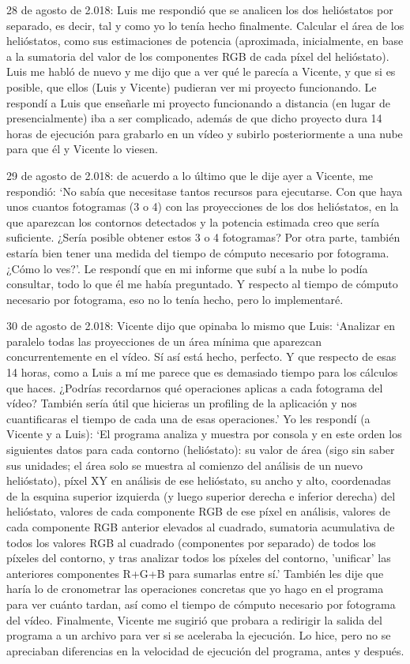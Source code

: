 \documentclass[12pt]{article}
\begin{document}
28 de agosto de 2.018: Luis me respondió que se analicen los dos helióstatos por separado, es decir, tal y como yo lo tenía hecho finalmente. Calcular el área de los helióstatos, como sus estimaciones de potencia (aproximada, inicialmente, en base a la sumatoria del valor de los componentes RGB de cada píxel del helióstato). Luis me habló de nuevo y me dijo que a ver qué le parecía a Vicente, y que si es posible, que ellos (Luis y Vicente) pudieran ver mi proyecto funcionando. Le respondí a Luis que enseñarle mi proyecto funcionando a distancia (en lugar de presencialmente) iba a ser complicado, además de que dicho proyecto dura 14 horas de ejecución para grabarlo en un vídeo y subirlo posteriormente a una nube para que él y Vicente lo viesen.

29 de agosto de 2.018: de acuerdo a lo último que le dije ayer a Vicente, me respondió: ‘No sabía que necesitase tantos recursos para ejecutarse. Con que haya unos cuantos fotogramas (3 o 4) con las proyecciones de los dos helióstatos, en la que aparezcan los contornos detectados y la potencia estimada creo que sería suficiente. ¿Sería posible obtener estos 3 o 4 fotogramas? Por otra parte, también estaría bien tener una medida del tiempo de cómputo necesario por fotograma. ¿Cómo lo ves?’. Le respondí que en mi informe que subí a la nube lo podía consultar, todo lo que él me había preguntado. Y respecto al tiempo de cómputo necesario por fotograma, eso no lo tenía hecho, pero lo implementaré.

30 de agosto de 2.018: Vicente dijo que opinaba lo mismo que Luis: ‘Analizar en paralelo todas las proyecciones de un área mínima que aparezcan concurrentemente en el vídeo. Sí así está hecho, perfecto. Y que respecto de esas 14 horas, como a Luis a mí me parece que es demasiado tiempo para los cálculos que haces. ¿Podrías recordarnos qué operaciones aplicas a cada fotograma del vídeo? También sería útil que hicieras un profiling de la aplicación y nos cuantificaras el tiempo de cada una de esas operaciones.’ Yo les respondí (a Vicente y a Luis): ‘El programa analiza y muestra por consola y en este orden los siguientes datos para cada contorno (helióstato): su valor de área (sigo sin saber sus unidades; el área solo se muestra al comienzo del análisis de un nuevo helióstato), píxel XY en análisis de ese helióstato, su ancho y alto, coordenadas de la esquina superior izquierda (y luego superior derecha e inferior derecha) del helióstato, valores de cada componente RGB de ese píxel en análisis, valores de cada componente RGB anterior elevados al cuadrado, sumatoria acumulativa de todos los valores RGB al cuadrado (componentes por separado) de todos los píxeles del contorno, y tras analizar todos los píxeles del contorno, 'unificar' las anteriores componentes R+G+B para sumarlas entre sí.’ También les dije que haría lo de cronometrar las operaciones concretas que yo hago en el programa para ver cuánto tardan, así como el tiempo de cómputo necesario por fotograma del vídeo. Finalmente, Vicente me sugirió que probara a redirigir la salida del programa a un archivo para ver si se aceleraba la ejecución. Lo hice, pero no se apreciaban diferencias en la velocidad de ejecución del programa, antes y después.
\end{document}
